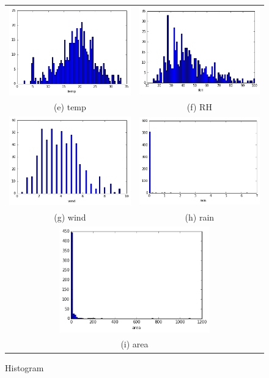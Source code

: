 \begin{figure}
\begin{tabular}{cc}
  \includegraphics[width=65mm]{images/hist/temp.png} &   \includegraphics[width=65mm]{images/hist/RH.png} \\
(e) temp & (f) RH \\[6pt]
  \includegraphics[width=65mm]{images/hist/wind.png} &   \includegraphics[width=65mm]{images/hist/rain.png} \\
(g) wind & (h) rain \\[6pt]
\multicolumn{2}{c}{\includegraphics[width=65mm]{images/hist/area.png} }\\
\multicolumn{2}{c}{(i) area}
\end{tabular}
\caption{Histogram}
\end{figure}